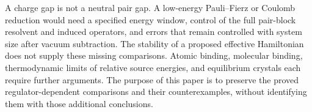 A charge gap is not a neutral pair gap. A low-energy Pauli--Fierz or
Coulomb reduction would need a specified energy window, control of
the full pair-block resolvent and induced operators, and errors that
remain controlled with system size after vacuum subtraction. The
stability of a proposed effective Hamiltonian does not supply these
missing comparisons. Atomic binding, molecular binding, thermodynamic
limits of relative source energies, and equilibrium crystals each
require further arguments. The purpose of this paper is to preserve
the proved regulator-dependent comparisons and their counterexamples,
without identifying them with those additional conclusions.
